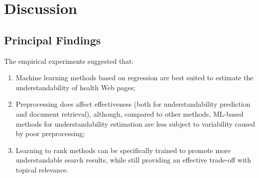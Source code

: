
\section*{Discussion}






\subsection*{Principal Findings}

The empirical experiments suggested that:

\vspace{-4pt}
\begin{enumerate}[leftmargin=*]
	\item Machine learning methods based on regression are best suited to estimate the understandability of health Web pages;
	\item Preprocessing does affect effectiveness (both for understandability prediction and document retrieval), although, compared to other methods, ML-based methods for understandability estimation are less subject to variability caused by poor preprocessing;
	\item Learning to rank methods can be specifically trained to promote more understandable search results, while still providing an effective trade-off with topical relevance.
\end{enumerate} 


